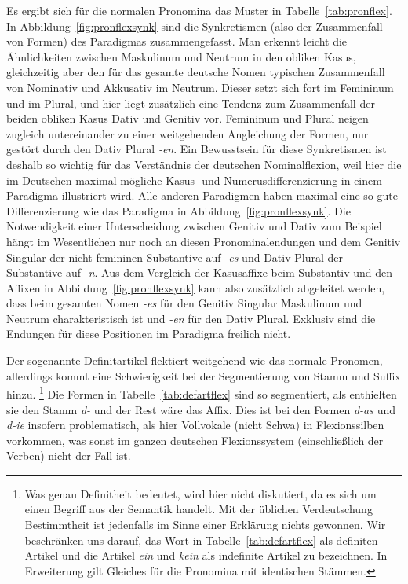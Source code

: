 Es ergibt sich für die normalen Pronomina das Muster in Tabelle~\ref{tab:pronflex}.
In Abbildung~\ref{fig:pronflexsynk} sind die Synkretismen (also der Zusammenfall von Formen) des Paradigmas zusammengefasst.
Man erkennt leicht die Ähnlichkeiten zwischen Maskulinum und Neutrum in den obliken Kasus, gleichzeitig aber den für das gesamte deutsche Nomen typischen Zusammenfall von Nominativ und Akkusativ im Neutrum.
Dieser setzt sich fort im Femininum und im Plural, und hier liegt zusätzlich eine Tendenz zum Zusammenfall der beiden obliken Kasus Dativ und Genitiv vor.
Femininum und Plural neigen zugleich untereinander zu einer weitgehenden Angleichung der Formen, nur gestört durch den Dativ Plural \textit{-en}.
Ein Bewusstsein für diese Synkretismen ist deshalb so wichtig für das Verständnis der deutschen Nominalflexion, weil hier die im Deutschen maximal mögliche Kasus- und Numerusdifferenzierung in einem Paradigma illustriert wird.
Alle anderen Paradigmen haben maximal eine so gute Differenzierung wie das Paradigma in Abbildung~\ref{fig:pronflexsynk}.
Die Notwendigkeit einer Unterscheidung zwischen Genitiv und Dativ zum Beispiel hängt im Wesentlichen nur noch an diesen Pronominalendungen und dem Genitiv Singular der nicht-femininen Substantive auf \textit{-es} und Dativ Plural der Substantive auf \textit{-n}.
Aus dem Vergleich der Kasusaffixe beim Substantiv und den Affixen in Abbildung~\ref{fig:pronflexsynk} kann also zusätzlich abgeleitet werden, dass beim gesamten Nomen \textit{-es} für den Genitiv Singular Maskulinum und Neutrum charakteristisch ist und \textit{-en} für den Dativ Plural.
Exklusiv sind die Endungen für diese Positionen im Paradigma freilich nicht.


Der sogenannte Definitartikel flektiert weitgehend wie das normale Pronomen, allerdings kommt eine Schwierigkeit bei der Segmentierung von Stamm und Suffix hinzu.%
\footnote{Was genau Definitheit bedeutet, wird hier nicht diskutiert, da es sich um einen Begriff aus der Semantik handelt.
Mit der üblichen Verdeutschung Bestimmtheit ist jedenfalls im Sinne einer Erklärung nichts gewonnen.
Wir beschränken uns darauf, das Wort in Tabelle~\ref{tab:defartflex} als definiten Artikel und die Artikel \textit{ein} und \textit{kein} als indefinite Artikel zu bezeichnen.
In Erweiterung gilt Gleiches für die Pronomina mit identischen Stämmen.}
Die Formen in Tabelle~\ref{tab:defartflex} sind so segmentiert, als enthielten sie den Stamm \textit{d-} und der Rest wäre das Affix.
Dies ist bei den Formen \textit{d-as} und \textit{d-ie} insofern problematisch, als hier Vollvokale (nicht Schwa) in Flexionssilben vorkommen, was sonst im ganzen deutschen Flexionssystem (einschließlich der Verben) nicht der Fall ist.

